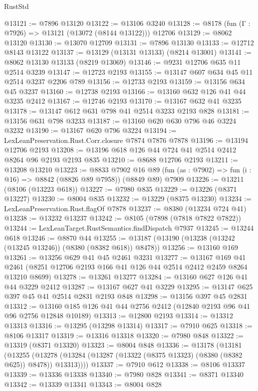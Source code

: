 \begin{lexlean}{RustStd}
\begin{coremodule}
@13121 := @7896 @13120
@13122 := @13106 @3240
@13128 := @8178 (fun (Γ : @7926) => @13121 (@13072 (@8144 @13122))) @12706
@13129 := @8062 @13120
@13130 := @13070 @12709
@13131 := @7896 @13130
@13133 := @12712 @8143 @13122
@13137 := @13129 (@13131 @13133) (@8214 @13001)
@13141 := @8062 @13130 @13133 (@8219 @13069)
@13146 := @9231 @12706 @635 @11 @2514 @3239
@13147 := @12723 @2193
@13155 := @13147 @607 @634 @45 @11 @2514 @3237 @2206 @789
@13156 := @12733 @2193
@13159 := @13156 @634 @45 @3237
@13160 := @12738 @2193
@13166 := @13160 @632 @126 @41 @44 @3235 @2412
@13167 := @12746 @2193
@13170 := @13167 @632 @41 @3235
@13178 := @13147 @612 @631 @798 @41 @2514 @3233 @2193 @828
@13181 := @13156 @631 @798 @3233
@13187 := @13160 @620 @630 @796 @46 @3224 @3232
@13190 := @13167 @620 @796 @3224
@13194 := LexLeanPreservation.Rust.Corr.closure @7874 @7876 @7878
@13196 := @13194 @12706 @2193
@13208 := @13196 @618 @126 @44 @724 @41 @2514 @2412 @8264 @96 @2193 @2193 @835
@13210 := @8688 @12706 @2193
@13211 := @13208 @13210
@13223 := @8833
    @7902
    @16
    @89
    (fun (as : @7902) => fun (i : @16) => @8842 (@8826 @89 @7958))
    (@8849 @89)
    @7909
@13226 := @13211 (@8106 (@13223 @618))
@13227 := @7980 @835
@13229 := @13226 (@8371 @13227)
@13230 := @8004 @835
@13232 := @13229 (@8375 @13230)
@13234 := LexLeanPreservation.Rust.flagOf @7878
@13237 := @8380 (@13234 @724 @41)
@13238 := @13232 @13237
@13242 := @8105 (@7898 (@7818 @7822 @7822))
@13244 := LexLeanTarget.RustSemantics.findDispatch @7937
@13245 := @13244 @618
@13246 := @8870 @44
@13255 := @13187 (@13190 (@13238 (@13242 (@13245 @13246)) (@8380 (@8382 @618)) @8478))
@13256 := @13160 @169
@13261 := @13256 @629 @41 @45 @2461 @3231
@13277 := @13167
    @169
    @41
    @2461
    (@8251 @12706 @2193 @166 @41 @126 @44 @2514 @2412 @2459 @8264 @13210 @8699)
@13278 := @13261 @13277
@13284 := @13160 @627 @126 @41 @44 @3229 @2412
@13287 := @13167 @627 @41 @3229
@13295 := @13147 @625 @397 @45 @41 @2514 @2831 @2193 @848
@13298 := @13156 @397 @45 @2831
@13312 := @13160 @185 @126 @41 @44 @2756 @2412 (@12840 @2193 @96 @41 @96 @2756 @12848 @10189)
@13313 := @12800 @2193
@13314 := @13312 @13313
@13316 := @13295 (@13298 @13314)
@13317 := @7910 @625
@13318 := @8106 @13317
@13319 := @13316 @13318
@13320 := @7980 @848
@13322 := @13319 (@8371 @13320)
@13323 := @8004 @848
@13336 := @13178
    (@13181
      (@13255 (@13278 (@13284 (@13287 (@13322 (@8375 @13323) (@8380 (@8382 @625)) @8478)) @13313))))
@13337 := @7910 @612
@13338 := @8106 @13337
@13339 := @13336 @13338
@13340 := @7980 @828
@13341 := @8371 @13340
@13342 := @13339 @13341
@13343 := @8004 @828

\end{coremodule}
\end{lexlean}
